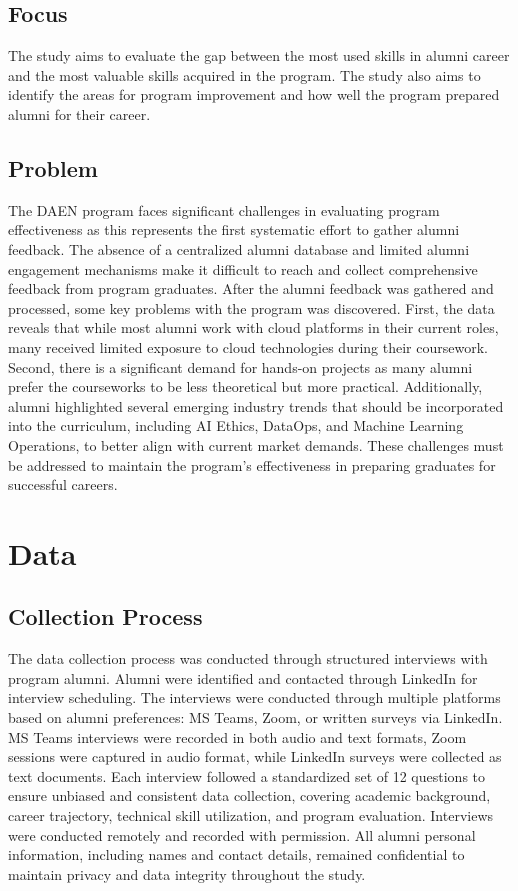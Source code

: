\documentclass[12pt,a4paper]{article}
\begin{document}
\subsection{Focus}
The study aims to evaluate the gap between the most used skills in alumni career and the most valuable skills acquired in the program. The study also aims to identify the areas for program improvement and how well the program prepared alumni for their career.

\subsection{Problem}
The DAEN program faces significant challenges in evaluating program effectiveness as this represents the first systematic effort to gather alumni feedback. The absence of a centralized alumni database and limited alumni engagement mechanisms make it difficult to reach and collect comprehensive feedback from program graduates. After the alumni feedback was gathered and processed, some key problems with the program was discovered. First, the data reveals that while most alumni work with cloud platforms in their current roles, many received limited exposure to cloud technologies during their coursework. Second, there is a significant demand for hands-on projects as many alumni prefer the courseworks to be less theoretical but more practical. Additionally, alumni highlighted several emerging industry trends that should be incorporated into the curriculum, including AI Ethics, DataOps, and Machine Learning Operations, to better align with current market demands. These challenges must be addressed to maintain the program's effectiveness in preparing graduates for successful careers.

\section{Data}
\subsection{Collection Process}
The data collection process was conducted through structured interviews with program alumni. Alumni were identified and contacted through LinkedIn for interview scheduling. The interviews were conducted through multiple platforms based on alumni preferences: MS Teams, Zoom, or written surveys via LinkedIn. MS Teams interviews were recorded in both audio and text formats, Zoom sessions were captured in audio format, while LinkedIn surveys were collected as text documents. Each interview followed a standardized set of 12 questions to ensure unbiased and consistent data collection, covering academic background, career trajectory, technical skill utilization, and program evaluation. Interviews were conducted remotely and recorded with permission. All alumni personal information, including names and contact details, remained confidential to maintain privacy and data integrity throughout the study. 
\end{document}
